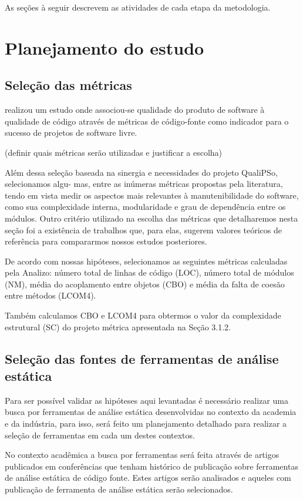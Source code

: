 \documentclass[qual, classic, a4paper]{ufbathesis}
\begin{document}
As seções à seguir descrevem as atividades de cada etapa da metodologia.

\section{Planejamento do estudo}

\subsection{Seleção das métricas}

 realizou um estudo onde associou-se
qualidade do produto de software à qualidade de código através de métricas de
código-fonte como indicador para o sucesso de projetos de software livre.

(definir quais métricas serão utilizadas e justificar a escolha)

Além dessa seleção baseada na sinergia e necessidades do projeto QualiPSo, selecionamos algu-
mas, entre as inúmeras métricas propostas pela literatura, tendo em vista medir os aspectos mais
relevantes à manutenibilidade do software, como sua complexidade interna, modularidade e grau de
dependência entre os módulos. Outro critério utilizado na escolha das métricas que detalharemos
nesta seção foi a existência de trabalhos que, para elas, sugerem valores teóricos de referência para
compararmos nossos estudos posteriores.

De acordo com nossas hipóteses, selecionamos as seguintes métricas calculadas pela Analizo:
número total de linhas de código (LOC), número total de módulos (NM), média do acoplamento
entre objetos (CBO) e média da falta de coesão entre métodos (LCOM4).

Também calculamos CBO e LCOM4 para obtermos o valor da complexidade estrutural
(SC) do projeto métrica apresentada na Seção 3.1.2.

\subsection{Seleção das fontes de ferramentas de análise estática}

Para ser possível validar as hipóteses aqui levantadas é necessário realizar
uma busca por ferramentas de análise estática desenvolvidas no contexto da
academia e da indústria, para isso, será feito um planejamento detalhado para
realizar a seleção de ferramentas em cada um destes contextos.

No contexto acadêmica a busca por ferramentas será feita
através de artigos publicados em conferências que tenham histórico de
publicação sobre ferramentas de análise estática de código fonte. Estes
artigos serão analisados e aqueles com publicação de ferramenta de análise
estática serão selecionados.
\end{document}
